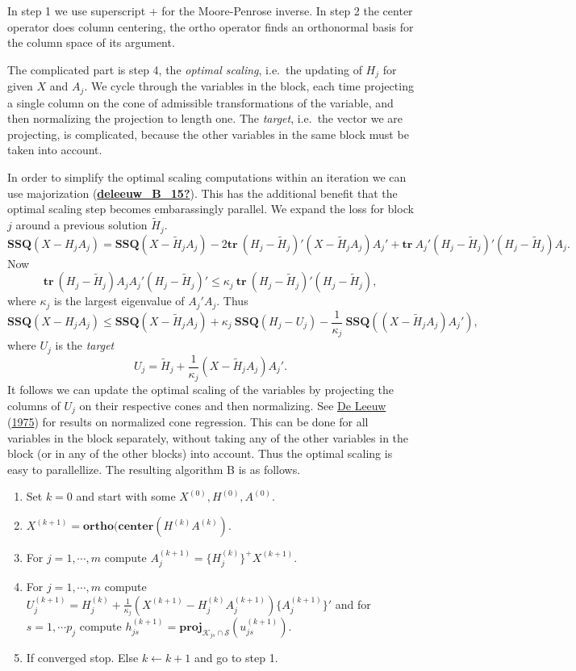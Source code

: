 \documentclass[
  12pt,
]{book}
\providecommand{\tightlist}{%
  \setlength{\itemsep}{0pt}\setlength{\parskip}{0pt}}
\begin{document}
In step 1 we use superscript + for the Moore-Penrose inverse. In step 2 the center operator does column centering, the ortho operator finds an orthonormal basis for the column space of its argument.

The complicated part is step 4, the \emph{optimal scaling}, i.e.~the updating of \(H_j\) for given \(X\) and \(A_j\). We cycle through the variables in the block, each time projecting a single column on the cone of admissible transformations of the variable, and then normalizing the projection to length one.
The \emph{target}, i.e.~the vector we are projecting, is complicated, because the other variables in the same block must be taken into account.

In order to simplify the optimal scaling computations within an iteration we can use majorization (\protect\hyperlink{ref-deleeuw_B_15}{\textbf{deleeuw\_B\_15?}}). This has the additional benefit that the optimal scaling step becomes embarassingly parallel. We expand the loss for block \(j\) around a previous solution \(\tilde H_j\).
\[
\mathbf{SSQ}(X-H_jA_j)=
\mathbf{SSQ}(X-\tilde H_jA_j)-2\mathbf{tr}\ (H_j-\tilde H_j)'(X-\tilde H_jA_j)A_j'
+\mathbf{tr}\ A_j'(H_j-\tilde H_j)'(H_j-\tilde H_j)A_j.
\]
Now
\[
\mathbf{tr}\ (H_j-\tilde H_j)A_jA_j'(H_j-\tilde H_j)'\leq\kappa_j\ \mathbf{tr}\ (H_j-\tilde H_j)'(H_j-\tilde H_j),
\]
where \(\kappa_j\) is the largest eigenvalue of \(A_j'A_j\). Thus
\[
\mathbf{SSQ}(X-H_jA_j)\leq\mathbf{SSQ}(X-\tilde H_jA_j)+\kappa_j\ \mathbf{SSQ}(H_j-U_j)-\frac{1}{\kappa_j}\ \mathbf{SSQ}((X-\tilde H_jA_j)A_j'),
\]
where \(U_j\) is the \emph{target}
\[
U_j=\tilde H_j+\frac{1}{\kappa_j}(X-\tilde H_jA_j)A_j'.\tag{3}
\]
It follows we can update the optimal scaling of the variables by projecting the columns of \(U_j\)
on their respective cones and then normalizing. See \protect\hyperlink{ref-deleeuw_U_75a}{De Leeuw} (\protect\hyperlink{ref-deleeuw_U_75a}{1975}) for results on normalized cone regression. This can be done for all variables in the block separately, without taking any of the other variables in the block (or in any of the other blocks) into account. Thus the optimal scaling is easy to parallellize. The resulting algorithm B is as follows.

\begin{enumerate}
\def\labelenumi{\arabic{enumi}.}
\setcounter{enumi}{-1}
\tightlist
\item
  Set \(k=0\) and start with some \(X^{(0)},H^{(0)},A^{(0)}\).
\item
  \(X^{(k+1)}=\mathbf{ortho}(\mathbf{center}(H^{(k)}A^{(k)})\).
\item
  For \(j=1,\cdots,m\) compute \(A_j^{(k+1)}=\{H_j^{(k)}\}^+X^{(k+1)}\).
\item
  For \(j=1,\cdots,m\) compute \(U_j^{(k+1)}=H_j^{(k)}+\frac{1}{\kappa_j}(X^{(k+1)}-H_j^{(k)}A_j^{(k+1)})\{A_j^{(k+1)}\}'\) and for \(s=1,\cdots p_j\) compute \(h_{js}^{(k+1)}=\mathbf{proj}_{\mathcal{K}_{js}\cap\mathcal{S}}(u_{js}^{(k+1)})\).
\item
  If converged stop. Else \(k\leftarrow k+1\) and go to step 1.
\end{enumerate}
\end{document}
